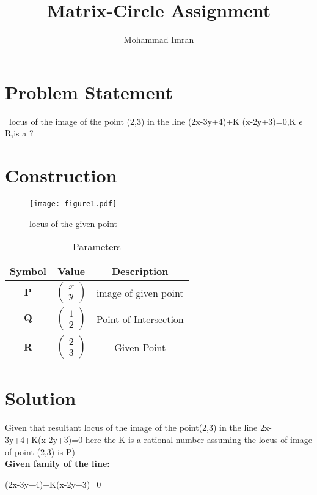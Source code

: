 \documentclass[journal,12pt,twocolumn]{article}
\newcommand{\myvec}[1]{\ensuremath{\begin{pmatrix}#1\end{pmatrix}}}
\let\vec\mathbf
\begin{document}
\title
{Matrix-Circle Assignment}
\author{Mohammad Imran}

\maketitle
\tableofcontents
\bigskip
\section{Problem Statement}
\ locus of the image of the point (2,3) in the line (2x-3y+4)+K
(x-2y+3)=0,K $\epsilon$ R,is a ?\\


\section{Construction}

\begin{figure}[h]
    \centering
\texttt{[image: figure1.pdf]}
    \caption{locus of the given point}
    \label{fig:my_label}
\end{figure}
\vspace{2cm}
\begin{table}[h]
    \centering
    \begin{tabular}{|c|c|c|}
       \hline
       \textbf{Symbol}&\textbf{Value}&\textbf{Description}  \\
       \hline
	    $\vec{P}$ & $\myvec{
		    x\\
		    y}$
	    & image of given point\\
        \hline
	    $\vec{Q}$ & $\myvec{1\\2}$
 & Point of Intersection\\
        \hline
	    $\vec{R}$ & $\myvec{
  2\\
  3}$
 & Given Point \\
        \hline
    \end{tabular}
    \caption{Parameters}
    \label{tab:my_label}
\end{table}

\section{Solution}
Given that resultant locus of the image of the point(2,3) in the line 2x-3y+4+K(x-2y+3)=0 here the K is a rational number assuming the locus of image of point (2,3) is P)\\


\textbf{Given family of the line:}
\vspace{0.3cm}
 \begin{center}
 (2x-3y+4)+K(x-2y+3)=0
 
 \end{center}
\vspace{0.3cm}
 
\end{document}
